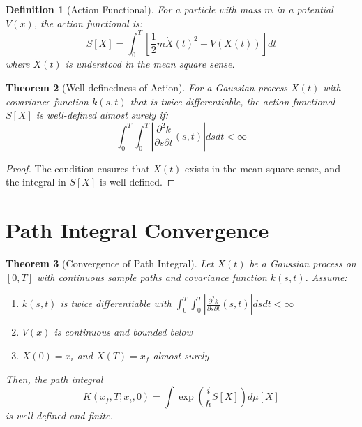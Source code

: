 \documentclass{article}
\newtheorem{theorem}{Theorem}
\newtheorem{definition}[theorem]{Definition}
\begin{document}
\begin{definition}[Action Functional]
For a particle with mass $m$ in a potential $V(x)$, the action functional is:
\begin{equation}
    S[X] = \int_0^T \left[\frac{1}{2}m\dot{X}(t)^2 - V(X(t))\right] dt
\end{equation}
where $\dot{X}(t)$ is understood in the mean square sense.
\end{definition}

\begin{theorem}[Well-definedness of Action]
For a Gaussian process $X(t)$ with covariance function $k(s,t)$ that is twice differentiable, the action functional $S[X]$ is well-defined almost surely if:
\begin{equation}
    \int_0^T \int_0^T \left|\frac{\partial^2 k}{\partial s \partial t}(s,t)\right| ds dt < \infty
\end{equation}
\end{theorem}

\begin{proof}
The condition ensures that $\dot{X}(t)$ exists in the mean square sense, and the integral in $S[X]$ is well-defined.
\end{proof}

\section{Path Integral Convergence}

\begin{theorem}[Convergence of Path Integral]
Let $X(t)$ be a Gaussian process on $[0,T]$ with continuous sample paths and covariance function $k(s,t)$. Assume:

\begin{enumerate}
    \item $k(s,t)$ is twice differentiable with $\int_0^T \int_0^T |\frac{\partial^2 k}{\partial s \partial t}(s,t)| ds dt < \infty$
    \item $V(x)$ is continuous and bounded below
    \item $X(0) = x_i$ and $X(T) = x_f$ almost surely
\end{enumerate}

Then, the path integral
\begin{equation}
    K(x_f, T; x_i, 0) = \int \exp\left(\frac{i}{\hbar}S[X]\right) d\mu[X]
\end{equation}
is well-defined and finite.
\end{theorem}
\end{document}
